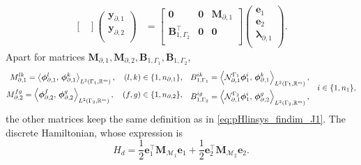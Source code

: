 \begin{equation}
\begin{aligned}
\begin{bmatrix}
\end{bmatrix}
\begin{pmatrix}
\mathbf{y}_{\partial, 1} \\
\mathbf{y}_{\partial, 2} \\
\end{pmatrix}
&= \begin{bmatrix}
\mathbf{0} & \mathbf{0} & \mathbf{M}_{\partial, 1} \\
\mathbf{B}_{1, \Gamma_2}^\top & \mathbf{0} & \mathbf{0} \\
\end{bmatrix}\begin{pmatrix}
\mathbf{e}_{1} \\
\mathbf{e}_{2} \\
{\bm{\lambda}}_{\partial, 1} \\
\end{pmatrix}.
\end{aligned}
\end{equation}
Apart for matrices $\mathbf{M}_{\partial, 1}, \mathbf{M}_{\partial, 2}, \mathbf{B}_{1, \Gamma_1}, \mathbf{B}_{1, \Gamma_2}$,
\begin{equation}
\begin{aligned}
{M}_{\partial, 1}^{lk} = \inner[L^2(\Gamma_1, \mathbb{R}^m)]{\bm{\phi}_{\partial, 1}^l}{\bm{\phi}_{\partial, 1}^k}, \quad (l,k) \in \{1,n_{\partial, 1}\}, \\
{M}_{\partial, 2}^{fg} = \inner[L^2(\Gamma_2, \mathbb{R}^m)]{\bm{\phi}_{\partial, 2}^f}{\bm{\phi}_{\partial, 2}^g}, \quad (f,g) \in \{1,n_{\partial, 2}\},\\
\end{aligned}  \quad
\begin{aligned}
{B}_{1, \Gamma_1}^{ik} = \inner[L^2(\Gamma_1, \mathbb{R}^m)]{\mathcal{N}_{\partial, 1}^{\Gamma_1}\bm{\phi}_{1}^i}{\bm{\phi}_{\partial, 1}^k}, \\
{B}_{1, \Gamma_2}^{ig} = \inner[L^2(\Gamma_2, \mathbb{R}^m)]{\mathcal{N}_{\partial, 1}^{\Gamma_2}\bm{\phi}_{1}^i}{\bm{\phi}_{\partial, 2}^g}, \\
\end{aligned} \quad i \in \{1,n_1\},
\end{equation} 
the other matrices keep the same definition as in \eqref{eq:pHlinsys_findim_J1}. The discrete Hamiltonian, whose expression is \cite{beattie2018linear}
\begin{equation}
H_d = \frac{1}{2} \mathbf{e}_1^\top \mathbf{M}_{\mathcal{M}_1} \mathbf{e}_1 + \frac{1}{2} \mathbf{e}_2^\top \mathbf{M}_{\mathcal{M}_2} \mathbf{e}_2.
\end{equation}
